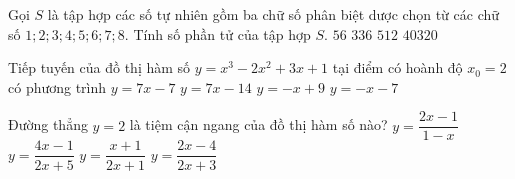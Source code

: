 \begin{ex}%
Gọi $S$ là tập hợp các số tự nhiên gồm ba chữ số phân biệt dược chọn từ các chữ số $1;2;3;4;5;6;7;8$. Tính số phần tử của tập hợp $S$.
\choice
{$56$}
{\True $336$}
{$512$}
{$40320$}
\end{ex}

\begin{ex}%
Tiếp tuyến của đồ thị hàm số $y=x^3-2x^2+3x+1$ tại điểm có hoành độ $x_0=2$ có phương trình
\choice
{\True $y=7x-7$}
{$y=7x-14$}
{$y=-x+9$}
{$y=-x-7$}
\end{ex}

\begin{ex}%
Đường thẳng $y=2$ là tiệm cận ngang của đồ thị hàm số nào?
\choice
{$y=\dfrac{2x-1}{1-x}$}
{\True $y=\dfrac{4x-1}{2x+5}$}
{$y=\dfrac{x+1}{2x+1}$}
{$y=\dfrac{2x-4}{2x+3}$}
\loigiai{}
\end{ex}

